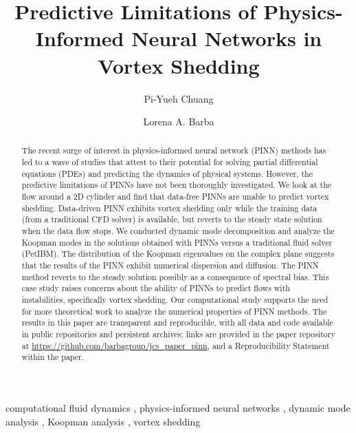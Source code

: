 \documentclass[5p, twocolumn, times, sort&compress]{elsarticle}
\begin{document}
    \begin{frontmatter}
        \title{%
        Predictive Limitations of Physics-Informed Neural Networks in Vortex Shedding%
        }

        \author[1]{Pi-Yueh Chuang}
        \author[1]{Lorena A. Barba}

        \begin{abstract}
            The recent surge of interest in physics-informed neural network (PINN) methods has led to a wave of studies that attest to their potential for solving partial differential equations (PDEs) and predicting the dynamics of physical systems. However, the predictive limitations of PINNs have not been thoroughly investigated. We look at the flow around a 2D cylinder and find that data-free PINNs are unable to predict vortex shedding. Data-driven PINN exhibits vortex shedding only while the training data (from a traditional CFD solver) is available, but reverts to the steady state solution when the data flow stops. We conducted dynamic mode decomposition and analyze the Koopman modes in the solutions obtained with PINNs versus a traditional fluid solver (PetIBM). The distribution of the Koopman eigenvalues on the complex plane suggests that the results of the PINN exhibit numerical dispersion and diffusion. The PINN method  reverts to the steady solution possibly as a consequence of spectral bias. This case study raises concerns about the ability of PINNs to predict flows with instabilities, specifically vortex shedding. Our computational study supports the need for more theoretical work to analyze the numerical properties of PINN methods. The results in this paper are transparent and reproducible, with all data and code available in public repositories and persistent archives; links are provided in the paper repository at \url{https://github.com/barbagroup/jcs_paper_pinn}, and a Reproducibility Statement within the paper.
        \end{abstract}

        \begin{keyword}
            computational fluid dynamics \sep
            physics-informed neural networks \sep
            dynamic mode analysis \sep
            Koopman analysis \sep
            vortex shedding
        \end{keyword}
    \end{frontmatter}
\end{document}
